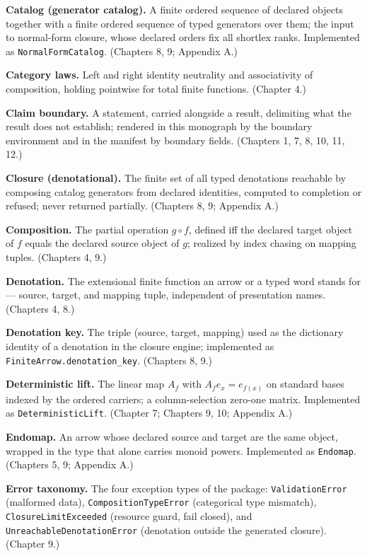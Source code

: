 \textbf{Catalog (generator catalog).} A finite ordered sequence of
declared objects together with a finite ordered sequence of typed
generators over them; the input to normal-form closure, whose declared
orders fix all shortlex ranks. Implemented as
\texttt{NormalFormCatalog}. (Chapters 8, 9; Appendix A.)

\textbf{Category laws.} Left and right identity neutrality and
associativity of composition, holding pointwise for total finite
functions. (Chapter 4.)

\textbf{Claim boundary.} A statement, carried alongside a result,
delimiting what the result does not establish; rendered in this
monograph by the boundary environment and in the manifest by boundary
fields. (Chapters 1, 7, 8, 10, 11, 12.)

\textbf{Closure (denotational).} The finite set of all typed
denotations reachable by composing catalog generators from declared
identities, computed to completion or refused; never returned
partially. (Chapters 8, 9; Appendix A.)

\textbf{Composition.} The partial operation $g \circ f$, defined iff
the declared target object of $f$ equals the declared source object of
$g$; realized by index chasing on mapping tuples. (Chapters 4, 9.)

\textbf{Denotation.} The extensional finite function an arrow or a
typed word stands for --- source, target, and mapping tuple,
independent of presentation names. (Chapters 4, 8.)

\textbf{Denotation key.} The triple (source, target, mapping) used as
the dictionary identity of a denotation in the closure engine;
implemented as \texttt{FiniteArrow.denotation\_key}. (Chapters 8, 9.)

\textbf{Deterministic lift.} The linear map $A_f$ with
$A_f e_x = e_{f(x)}$ on standard bases indexed by the ordered
carriers; a column-selection zero-one matrix. Implemented as
\texttt{DeterministicLift}. (Chapter 7; Chapters 9, 10; Appendix A.)

\textbf{Endomap.} An arrow whose declared source and target are the
same object, wrapped in the type that alone carries monoid powers.
Implemented as \texttt{Endomap}. (Chapters 5, 9; Appendix A.)

\textbf{Error taxonomy.} The four exception types of the package:
\texttt{ValidationError} (malformed data),
\texttt{CompositionTypeError} (categorical type mismatch),
\texttt{ClosureLimitExceeded} (resource guard, fail closed), and
\texttt{UnreachableDenotationError} (denotation outside the generated
closure). (Chapter 9.)


